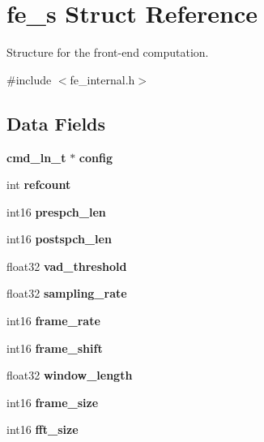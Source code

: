 \section{fe\+\_\+s Struct Reference}
\label{structfe__s}


Structure for the front-\/end computation.  




{\ttfamily \#include $<$fe\+\_\+internal.\+h$>$}

\subsection*{Data Fields}
\begin{DoxyCompactItemize}
\item 
{\bf cmd\+\_\+ln\+\_\+t} $\ast$ {\bfseries config}\label{structfe__s_abe27cd07861a2f0042f5a83f3371d0fb}

\item 
int {\bfseries refcount}\label{structfe__s_a4cdf2f8b372cfddb38a48dd770450af9}

\item 
int16 {\bfseries prespch\+\_\+len}\label{structfe__s_ac092f217405d5d273db71888bdd3930e}

\item 
int16 {\bfseries postspch\+\_\+len}\label{structfe__s_a3550f23ec53a567b1ce21923829b20b6}

\item 
float32 {\bfseries vad\+\_\+threshold}\label{structfe__s_a8c484564cca88e8aec167fe94bd27891}

\item 
float32 {\bfseries sampling\+\_\+rate}\label{structfe__s_af79879861c60083c1c0135c380bfe8e2}

\item 
int16 {\bfseries frame\+\_\+rate}\label{structfe__s_a23ca679cec8c0643dd1fa32b4e925f00}

\item 
int16 {\bfseries frame\+\_\+shift}\label{structfe__s_a62b189505f084007c3799faf3836b118}

\item 
float32 {\bfseries window\+\_\+length}\label{structfe__s_ae652f41503dd7b853bff8de89340703d}

\item 
int16 {\bfseries frame\+\_\+size}\label{structfe__s_a72b5838a48f3a10c8ba3917d245093d0}

\item 
int16 {\bfseries fft\+\_\+size}\label{structfe__s_a466b997c1f544043fb3ab6f2f89e97e7}


\end{DoxyCompactItemize}
